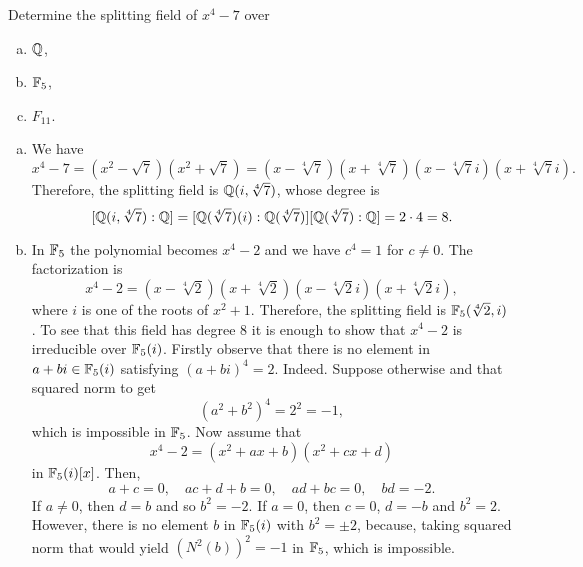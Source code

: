 \begin{probl}
    Determine the splitting field of $x^4 - 7$ over
    \begin{enumerate}[a), font=\upshape]
        \item $\mathbb{Q}$,
        \item $\mathbb F_5$,
        \item $F_{11}$.
    \end{enumerate}
\end{probl}

\begin{solution}
    \begin{enumerate}[a), font=\upshape]
        \item We have
        $$
            x^4-7 = (x^2-\sqrt7)(x^2+\sqrt7)
                =(x-\sqrt[4]7)(x+\sqrt[4]7)(x-\sqrt[4]7i)(x+\sqrt[4]7i).
        $$
        Therefore, the splitting field is $\mathbb{Q}(i,\sqrt[4]7)$, whose degree is
        $$
            [\mathbb{Q}(i,\sqrt[4]7):\mathbb{Q}]=[\mathbb{Q}(\sqrt[4]7)(i):\mathbb{Q}(\sqrt[4]7)][\mathbb{Q}(\sqrt[4]7):\mathbb{Q}]=2\cdot4=8.
        $$

        \item In $\mathbb F_5$ the polynomial becomes $x^4-2$ and we have $c^4=1$ for $c\ne0$. The factorization is
        $$
            x^4-2=(x-\sqrt[4]2)(x+\sqrt[4]2)(x-\sqrt[4]2i)(x+\sqrt[4]2i),
        $$
        where $i$ is one of the roots of $x^2+1$. Therefore, the splitting field is $\mathbb F_5(\sqrt[4]2,i)$. To see that this field has degree $8$ it is enough to show that $x^4-2$ is irreducible over $\mathbb F_5(i)$. Firstly observe that there is no element in $a+bi\in\mathbb F_5(i)$ satisfying $(a+bi)^4=2$. Indeed. Suppose otherwise and that squared norm to get
        $$
            (a^2+b^2)^4=2^2=-1,
        $$
        which is impossible in $\mathbb F_5$. Now assume that
        $$
            x^4-2=(x^2+ax+b)(x^2+cx+d)
        $$
        in $\mathbb F_5(i)[x]$. Then,
        $$
            a+c=0,\quad ac+d+b=0,\quad ad+bc=0,\quad bd=-2.
        $$
        If $a\ne0$, then $d=b$ and so $b^2=-2$. If $a=0$, then $c=0$, $d=-b$ and $b^2=2$. However, there is no element $b$ in $\mathbb F_5(i)$ with $b^2=\pm2$, because, taking squared norm that would yield $(N^2(b))^2=-1$ in $\mathbb F_5$, which is impossible.


\end{enumerate}
\end{solution}
